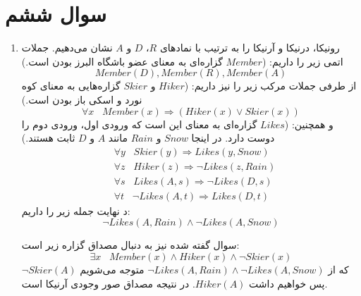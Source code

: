 \documentclass{article}
\begin{document}
\section*{
سوال ششم
}
\begin{enumerate}
	\item 

رونیکا، درنیکا و آرنیکا را به ترتیب با نمادهای $R$، $D$ و  $A$ نشان می‌دهیم. جملات اتمی زیر را داریم: ($Member$ گزاره‌ای به معنای عضو باشگاه البرز بودن است.)
$$Member(D), Member(R), Member(A)$$
از طرفی جملات مرکب زیر را نیز داریم: ($Hiker$ و $Skier$ گزاره‌هایی به معنای کوه نورد و اسکی باز بودن است.)
$$\forall x \; \; \; Member(x) \Longrightarrow (Hiker(x) \vee Skier(x))$$
و همچنین: ($Likes$ گزاره‌ای به معنای این است که ورودی اول، ورودی دوم را دوست دارد. در اینجا $Snow$ و $Rain$ مانند $A$ و $D$ ثابت هستند.) 
\begin{align}
	\label{rules}
	&\forall y \; \; \; Skier(y) \Longrightarrow Likes(y, Snow) \\
	&\forall z \; \; \; Hiker(z) \Longrightarrow \neg Likes(z, Rain) \\
	&\forall s \; \; \; Likes(A, s) \Longrightarrow \neg Likes(D, s) \\
	&\forall t \; \; \; \neg Likes(A, t) \Longrightarrow Likes(D, t)
\end{align}
د نهایت جمله زیر را داریم:
$$\neg Likes(A, Rain) \wedge \neg Likes(A, Snow)$$

سوال گفته شده نیز به دنبال مصداق گزاره زیر است:
$$\exists x \; \; \; Member(x) \wedge Hiker(x) \wedge \neg Skier(x)$$
که از $\neg Likes(A, Rain) \wedge \neg Likes(A, Snow)$ متوجه می‌شویم 
$\neg Skier(A)$
پس خواهیم داشت 
$Hiker(A)$.
در نتیجه مصداق صور وجودی آرنیکا است.
\end{enumerate}
\end{document}
